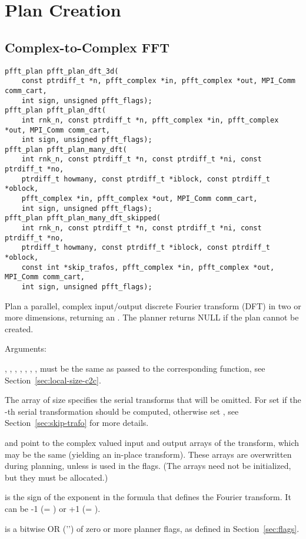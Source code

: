 \section{Plan Creation}\label{sec:create-plan}

\subsection{Complex-to-Complex FFT}\label{sec:create-plan-c2c}
\begin{lstlisting}
pfft_plan pfft_plan_dft_3d(
    const ptrdiff_t *n, pfft_complex *in, pfft_complex *out, MPI_Comm comm_cart,
    int sign, unsigned pfft_flags);
pfft_plan pfft_plan_dft(
    int rnk_n, const ptrdiff_t *n, pfft_complex *in, pfft_complex *out, MPI_Comm comm_cart,
    int sign, unsigned pfft_flags);
pfft_plan pfft_plan_many_dft(
    int rnk_n, const ptrdiff_t *n, const ptrdiff_t *ni, const ptrdiff_t *no,
    ptrdiff_t howmany, const ptrdiff_t *iblock, const ptrdiff_t *oblock,
    pfft_complex *in, pfft_complex *out, MPI_Comm comm_cart,
    int sign, unsigned pfft_flags);
pfft_plan pfft_plan_many_dft_skipped(
    int rnk_n, const ptrdiff_t *n, const ptrdiff_t *ni, const ptrdiff_t *no,
    ptrdiff_t howmany, const ptrdiff_t *iblock, const ptrdiff_t *oblock,
    const int *skip_trafos, pfft_complex *in, pfft_complex *out, MPI_Comm comm_cart,
    int sign, unsigned pfft_flags);
\end{lstlisting}
Plan a parallel, complex input/output discrete Fourier transform (DFT) in two or more dimensions, returning an .
The planner returns NULL if the plan cannot be created.

Arguments:
\begin{compactitem}
  \item {}, , , , , , ,  must be the same as passed
        to the corresponding  function, see Section~\ref{sec:local-size-c2c}.
  \item The array  of size  specifies the serial transforms that will be omitted.
        For  set  if the -th serial transformation should be computed,
        otherwise set , see Section~\ref{sec:skip-trafo} for more details.
  \item {} and  point to the complex valued input and output arrays of the transform, which may be the same (yielding an in-place transform).
        These arrays are overwritten during planning, unless  is used in the flags.
        (The arrays need not be initialized, but they must be allocated.)
  \item {} is the sign of the exponent in the formula that defines the Fourier transform. It can be -1 (= ) or +1 (= ).
  \item {} is a bitwise OR ('\code{|}') of zero or more planner flags, as defined in Section~\ref{sec:flags}.
\end{compactitem}

